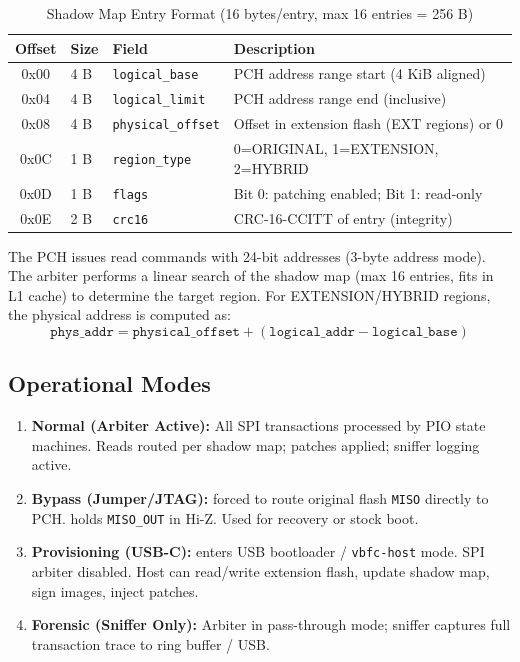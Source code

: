 \begin{table}[t]
\centering
\caption{Shadow Map Entry Format (16 bytes/entry, max 16 entries = 256 B)}
\label{tab:shadow_map_entry}
\begin{tabular}{@{}clll@{}}
\toprule
\textbf{Offset} & \textbf{Size} & \textbf{Field} & \textbf{Description} \\
\midrule
0x00 & 4 B & \texttt{logical\_base} & PCH address range start (4 KiB aligned) \\
0x04 & 4 B & \texttt{logical\_limit} & PCH address range end (inclusive) \\
0x08 & 4 B & \texttt{physical\_offset} & Offset in extension flash (EXT regions) or 0 \\
0x0C & 1 B & \texttt{region\_type} & 0=ORIGINAL, 1=EXTENSION, 2=HYBRID \\
0x0D & 1 B & \texttt{flags} & Bit 0: patching enabled; Bit 1: read-only \\
0x0E & 2 B & \texttt{crc16} & CRC-16-CCITT of entry (integrity) \\
\bottomrule
\end{tabular}
\end{table}

The \ac{PCH} issues read commands with 24-bit addresses (3-byte address mode). The arbiter performs a linear search of the shadow map (max 16 entries, fits in L1 cache) to determine the target region. For EXTENSION/HYBRID regions, the physical address is computed as:
\begin{equation}
\texttt{phys\_addr} = \texttt{physical\_offset} + (\texttt{logical\_addr} - \texttt{logical\_base})
\label{eq:addr_translation}
\end{equation}

\subsection{Operational Modes}
\begin{enumerate}
    \item \textbf{Normal (Arbiter Active):} All \ac{SPI} transactions processed by \ac{PIO} state machines. Reads routed per shadow map; patches applied; sniffer logging active.
    \item \textbf{Bypass (Jumper/JTAG):} \mx forced to route original flash \texttt{MISO} directly to \ac{PCH}. \rp holds \texttt{MISO\_OUT} in Hi-Z. Used for recovery or stock boot.
    \item \textbf{Provisioning (USB-C):} \rp enters USB bootloader / \texttt{vbfc-host} mode. \ac{SPI} arbiter disabled. Host can read/write extension flash, update shadow map, sign images, inject patches.
    \item \textbf{Forensic (Sniffer Only):} Arbiter in pass-through mode; sniffer captures full transaction trace to ring buffer / USB.
\end{enumerate}